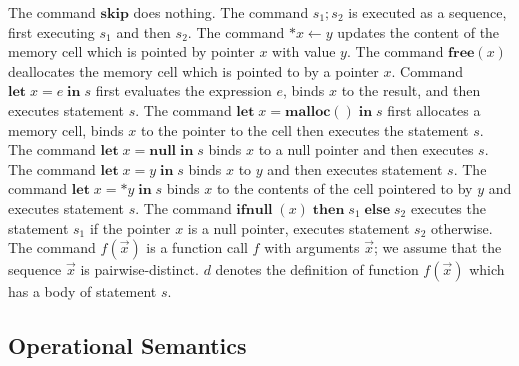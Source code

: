 \documentclass[english]{jssst_ppl} %
\newcommand\LET{\mathbf{let}\;}
\newcommand\IN{\mathbf{in}\;}
\newcommand\SKIP{\mathbf{skip}}
\newcommand\NULL{\mathbf{null}\;}
\newcommand\IFNULL{\mathbf{ifnull}\;}
\newcommand\THEN{\mathbf{then}\;}
\newcommand\ELSE{\mathbf{else}\;}
\newcommand\coma{,\;}
\newcommand\Malloc{\mathbf{malloc}}
\newcommand\Free{\mathbf{free}}
\newcommand\Cirx{(x)}
\theoremstyle{definition}
\begin{document}
The command $\SKIP$ does nothing. The command $s_{1};s_{2}$ is executed as a sequence, first executing $s_{1}$ and then $s_{2}$. The command $*x \leftarrow y$ updates the content of the memory cell which is pointed by pointer $x$ with value $y$. The command $\Free \Cirx$ deallocates the memory cell which is pointed to by a pointer $x$. Command $\LET x = e \; \IN s$ first evaluates the expression $e$, binds $x$ to the result, and then executes statement $s$. The command $\LET x = \Malloc() \; \IN s$ first allocates a memory cell, binds $x$ to the pointer to the cell then executes the statement $s$. The command $\LET x = \NULL  \IN s$ binds $x$ to a null pointer and then executes $s$. The command $\LET x = y \; \IN s$ binds $x$ to $y$ and then executes statement $s$. The command $\LET x = *y \; \IN s$ binds $x$ to the contents of the cell pointered to by $y$ and executes statement $s$. The command $\IFNULL(x) \; \THEN s_{1} \; \ELSE s_{2}$ executes the statement $s_{1}$ if the pointer $x$ is a null pointer, executes statement $s_{2}$ otherwise. The command $f(\vec{x})$ is a function call $f$ with arguments $\vec{x}$; we assume that the sequence $\vec{x}$ is pairwise-distinct. $d$ denotes the definition of function $f(\vec{x})$ which has a body of statement $s$.

\subsection{Operational Semantics}
\end{document}
